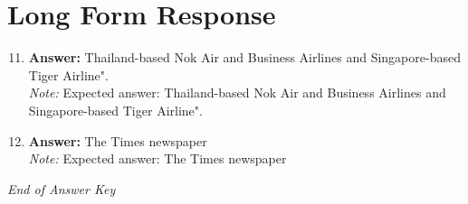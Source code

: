 \documentclass[12pt]{article}
\begin{document}
\section*{Long Form Response}
\begin{enumerate}[label=\arabic*.]
\setcounter{enumi}{10}
\item \textbf{Answer:} Thailand-based Nok Air and Business Airlines and Singapore-based Tiger Airline".
\\ \textit{Note:} Expected answer: Thailand-based Nok Air and Business Airlines and Singapore-based Tiger Airline".
\item \textbf{Answer:} The Times newspaper
\\ \textit{Note:} Expected answer: The Times newspaper
\end{enumerate}

\vfill
\noindent\textit{End of Answer Key}
\end{document}
